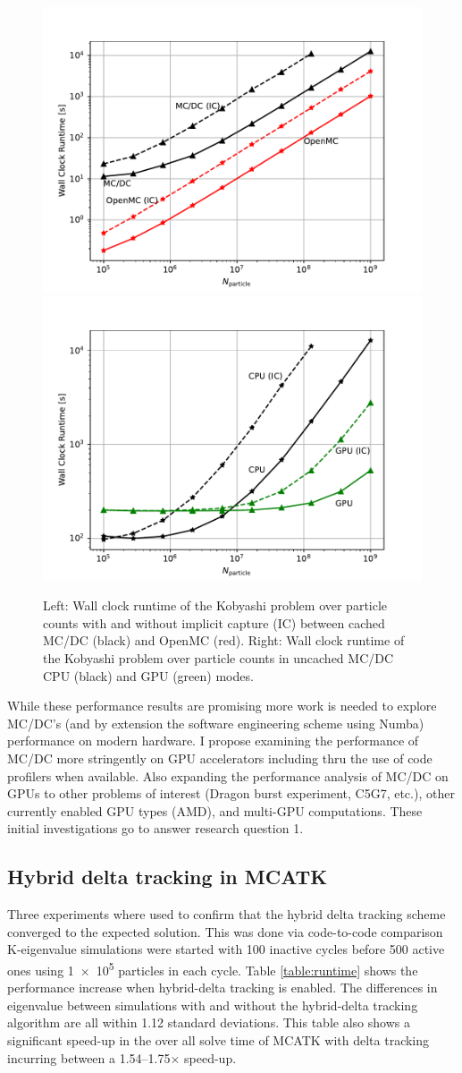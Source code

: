 \begin{figure}[h]
    \centering
    \includegraphics[width=.49\textwidth]{figures/results/code_comparisons.pdf}
    \includegraphics[width=.49\textwidth]{figures/results/mcdc_comparisons.pdf}
    \caption{Left: Wall clock runtime of the Kobyashi problem over particle counts with and without implicit capture (IC) between cached MC/DC (black) and OpenMC (red). 
    Right: Wall clock runtime of the Kobyashi problem over particle counts in uncached MC/DC CPU (black) and GPU (green) modes.}
    \label{performance_results}
\end{figure}

While these performance results are promising more work is needed to explore MC/DC's (and by extension the software engineering scheme using Numba) performance on modern hardware.
I propose examining the performance of MC/DC more stringently on GPU accelerators including thru the use of code profilers when available.
Also expanding the performance analysis of MC/DC on GPUs to other problems of interest (Dragon burst experiment, C5G7, etc.), other currently enabled GPU types (AMD), and multi-GPU computations.
These initial investigations go to answer research question 1.

\subsection{Hybrid delta tracking in MCATK}

Three experiments where used to confirm that the hybrid delta tracking scheme converged to the expected solution. This was done  via code-to-code comparison
K-eigenvalue simulations were started with 100 inactive cycles before 500 active ones using \num{1e5} particles in each cycle.
Table \ref{table:runtime} shows the performance increase when hybrid-delta tracking is enabled.
The differences in eigenvalue between simulations with and without the hybrid-delta tracking algorithm are all within 1.12 standard deviations. This table also shows a significant speed-up in the over all solve time of MCATK with delta tracking incurring between a 1.54--1.75$\times$ speed-up.


